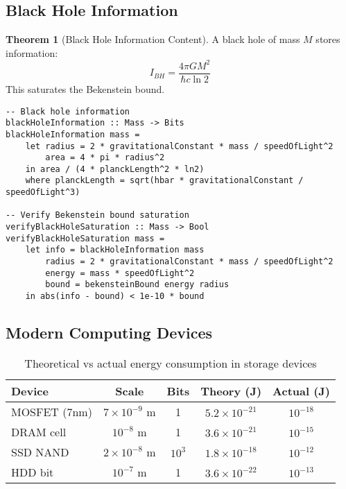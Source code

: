 \documentclass[11pt,a4paper]{article}
\theoremstyle{definition}
\newtheorem{theorem}{Theorem}[section]
\begin{document}
\subsection{Black Hole Information}

\begin{theorem}[Black Hole Information Content]
A black hole of mass $M$ stores information:
\begin{equation}
I_{BH} = \frac{4\pi G M^2}{\hbar c \ln 2}
\end{equation}
This saturates the Bekenstein bound.
\end{theorem}

\begin{lstlisting}
-- Black hole information
blackHoleInformation :: Mass -> Bits
blackHoleInformation mass =
    let radius = 2 * gravitationalConstant * mass / speedOfLight^2
        area = 4 * pi * radius^2
    in area / (4 * planckLength^2 * ln2)
    where planckLength = sqrt(hbar * gravitationalConstant / speedOfLight^3)

-- Verify Bekenstein bound saturation
verifyBlackHoleSaturation :: Mass -> Bool
verifyBlackHoleSaturation mass =
    let info = blackHoleInformation mass
        radius = 2 * gravitationalConstant * mass / speedOfLight^2
        energy = mass * speedOfLight^2
        bound = bekensteinBound energy radius
    in abs(info - bound) < 1e-10 * bound
\end{lstlisting}

\subsection{Modern Computing Devices}

\begin{table}[H]
\centering
\begin{tabular}{|l|c|c|c|c|}
\hline
\textbf{Device} & \textbf{Scale} & \textbf{Bits} & \textbf{Theory (J)} & \textbf{Actual (J)} \\
\hline
MOSFET (7nm) & $7 \times 10^{-9}$ m & 1 & $5.2 \times 10^{-21}$ & $10^{-18}$ \\
DRAM cell & $10^{-8}$ m & 1 & $3.6 \times 10^{-21}$ & $10^{-15}$ \\
SSD NAND & $2 \times 10^{-8}$ m & $10^3$ & $1.8 \times 10^{-18}$ & $10^{-12}$ \\
HDD bit & $10^{-7}$ m & 1 & $3.6 \times 10^{-22}$ & $10^{-13}$ \\
\hline
\end{tabular}
\caption{Theoretical vs actual energy consumption in storage devices}
\end{table}
\end{document}
